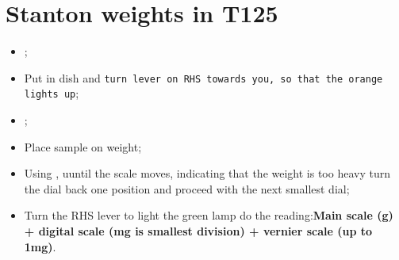 \section{Stanton weights in T125}
  \begin{itemize}
  	\item {};
  	\item Put in dish and \texttt{turn lever on RHS towards you, so that the orange lights up};
  	\item {};
  	\item Place sample on weight;
  	\item Using , uuntil the scale moves, indicating that the weight is too heavy \ra turn the dial back one position and proceed with the next smallest dial;
  	\item Turn the RHS lever to light the green lamp \ra do the reading:\newline \textbf{Main scale (g) + digital scale (mg is smallest division) + vernier scale (up to 1mg)}.
  \end{itemize}
\newpage